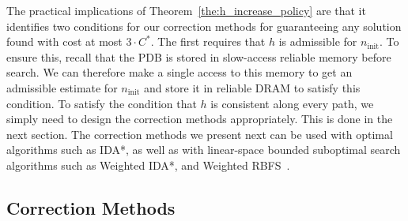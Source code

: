 \documentclass[letterpaper]{article}
\begin{document}
The practical implications of Theorem~\ref{the:h_increase_policy} are that it identifies two conditions for our correction methods for guaranteeing any solution found with cost at most $3 \cdot C^*$. The first requires that $h$ is admissible for $n_{\mathrm{init}}$. To ensure this, recall that the PDB is stored in slow-access reliable memory before search.
We can therefore make a single access to this memory to get an admissible estimate for $n_{\mathrm{init}}$ and store it in reliable DRAM to satisfy this condition. 
To satisfy the condition that $h$ is consistent along every path, we simply need to design the correction methods appropriately. This is done in the next section. 
The correction methods we present next can be used with optimal algorithms such as IDA*, as well as with 
linear-space bounded suboptimal search algorithms such as Weighted IDA*, and Weighted RBFS~\cite{Korf1992}. %









\subsection{Correction Methods}



\end{document}
